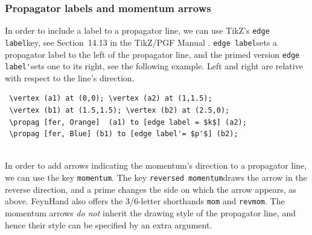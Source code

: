 \documentclass[10pt,letterpaper,twoside,notitlepage]{article}
\numberwithin{figure}{section}
\begin{document}
\vspace{-6mm}
\newpage\subsubsection{Propagator labels and momentum arrows}
\label{sec:_feynmandiagrams_proplabelsmomentum}
%
\noindent
In order to include a label to a propagator line,
we can use TikZ's \blucol\verb!edge label!\txcol key,
see Section~14.13 in the TikZ/PGF Manual \cite{tikz}.
\blucol\verb!edge label!\txcol sets a propagator label 
to the left of the propagator line, and the primed version
\blucol\verb!edge label'!\txcol sets one to its right,
see the following example.
Left and right are relative with respect to the line's direction.
\vspace{2mm}\\
%
\begin{minipage}{0.83\linewidth}
\blucol\begin{verbatim}
 \vertex (a1) at (0,0); \vertex (a2) at (1,1.5);
 \vertex (b1) at (1.5,1.5); \vertex (b2) at (2.5,0);
 \propag [fer, Orange]  (a1) to [edge label = $k$] (a2);
 \propag [fer, Blue] (b1) to [edge label'= $p'$] (b2);
\end{verbatim}\txcol
\end{minipage}
%
\begin{minipage}{0.16\linewidth}
\end{minipage}
\\
In order to add arrows indicating the momentum's direction to a propagator line,
we can use the key \blucol\verb!momentum!\txcol.
The key \blucol\verb!reversed momentum!\txcol draws the arrow in the reverse direction,
and a prime changes the side on which the arrow appears, as above.
FeynHand also offers the 3/6-letter shorthands \blucol\verb!mom!\txcol 
and \blucol\verb!revmom!\txcol.
The momentum arrows \emph{do not} inherit the drawing style of the propagator line,
and hence their style can be specified by an extra argument.
\vspace{2mm}\\
\end{document}
